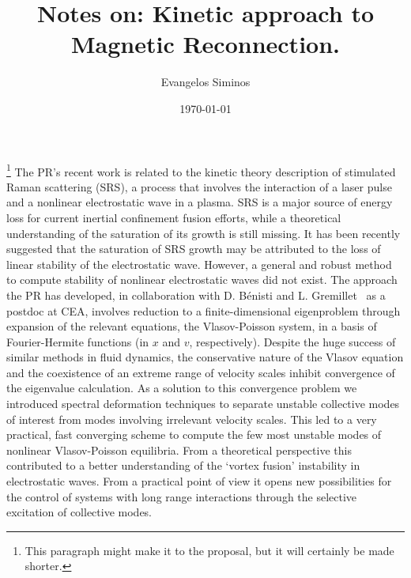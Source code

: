 \documentclass[a4paper,10pt]{article}
\title{Notes on: Kinetic approach to Magnetic Reconnection.}
\author{Evangelos Siminos}
\date{\today}
\begin{document}
\maketitle


\footnote{This paragraph might make it to the proposal, but it will certainly
be made shorter.} The PR's recent work is related 
to the kinetic theory description of stimulated 
Raman scattering (SRS), a process that involves the
interaction of a laser pulse and a nonlinear electrostatic wave in a plasma. 
SRS is a major source of energy loss for current inertial confinement 
fusion efforts, while a theoretical understanding of the saturation 
of its growth is still missing. It has been recently suggested that 
the saturation of SRS growth may be attributed
to the loss of linear stability of the electrostatic wave. However, a general
and robust method to compute stability of nonlinear electrostatic waves did not
exist. The approach the PR has developed, in collaboration with D. B\'enisti and L.
Gremillet~\cite{siminos11} as a postdoc at CEA, 
involves reduction to a finite-dimensional
eigenproblem through expansion of the relevant equations, the Vlasov-Poisson
system, in a basis of Fourier-Hermite functions (in $x$ and $v$, respectively). 
Despite the huge success of
similar methods in fluid dynamics, the conservative nature of the Vlasov
equation and the coexistence of an extreme range of velocity scales inhibit
convergence of the eigenvalue calculation. As a solution to this convergence
problem we introduced spectral deformation techniques
to separate unstable collective modes of interest from modes involving 
irrelevant velocity scales. This led to a very practical, 
fast converging scheme to compute the few most unstable modes of nonlinear 
Vlasov-Poisson equilibria.
From a theoretical perspective this contributed to a better understanding 
of the `vortex fusion' instability in electrostatic waves. 
From a practical point of view it opens new possibilities for the control 
of systems with long range interactions 
through the selective excitation of collective modes.
\end{document}
